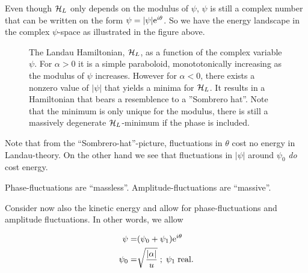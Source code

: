 Even though $\mathcal{H}_L$ only depends on the modulus of $\psi$, $\psi$ is still a complex number that can be written on the form $\psi=|\psi| \mathrm{e}^{i\theta}$. So we have the  energy landscape in the complex $\psi$-space as illustrated in the figure above.
\begin{figure}
\centering
{}
\caption{The Landau Hamiltonian, $\mathcal{H}_L$, as a function of the complex variable $\psi$. For $\alpha>0$ it is a simple paraboloid, monototonically increasing as the modulus of $\psi$ increases. However for $\alpha<0$, there exists a nonzero value of $|\psi|$ that yields a minima for $\mathcal{H}_L$.  It results in a Hamiltonian that bears a resemblence to a ''Sombrero hat''. Note that the minimum is only unique for the modulus, there is still a massively degenerate $\mathcal{H}_L$-minimum if the phase is included.}
\label{fig:1D_H}
\end{figure}

Note that from the ``Sombrero-hat''-picture, fluctuations in $\theta$ cost no energy in Landau-theory. On the other hand we see that fluctuations in $|\psi|$ around $\psi_0$ \emph{do} cost energy. 


Phase-fluctuations are ``massless''. Amplitude-fluctuations are ``massive''. 

Consider now also the kinetic energy and allow for phase-fluctuations and amplitude fluctuations. In other words, we allow 

\begin{equation}
\begin{aligned}
\psi =& (\psi_0 + \psi_1) \mathrm{e}^{i\theta}\\
\psi_0 =& \sqrt{\frac{|\alpha|}{u}} \; ; \; \psi_1 \; \mathrm{real}.
\label{psi_fluc}
\end{aligned}
\end{equation}


